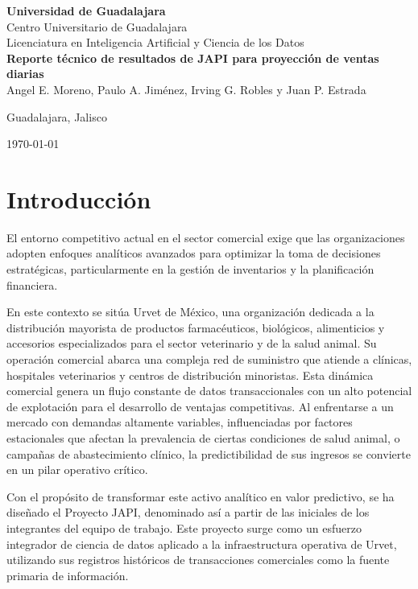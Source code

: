 \documentclass[11pt,a4paper]{report}
\begin{document}
\begin{titlepage}
    \centering
    
    {\textbf{Universidad de Guadalajara}}\\[0.5cm]
    {Centro Universitario de Guadalajara}\\[0.5cm]
    {Licenciatura en Inteligencia Artificial y Ciencia de los Datos}\\[2cm]
    
    {\textbf{Reporte técnico de resultados de JAPI para proyección de ventas diarias}}\\
    {Angel E. Moreno, Paulo A. Jiménez, Irving G. Robles y Juan P. Estrada}
    
    \vfill
    
    {Guadalajara, Jalisco \par}
    \monthyeardate\today
    
\end{titlepage}

\tableofcontents
\newpage

\section{Introducción}
El entorno competitivo actual en el sector comercial exige que las organizaciones adopten enfoques analíticos avanzados
para optimizar la toma de decisiones estratégicas, particularmente en la gestión de inventarios y la planificación financiera.

En este contexto se sitúa Urvet de México, una organización dedicada a la distribución mayorista de productos farmacéuticos,
biológicos, alimenticios y accesorios especializados para el sector veterinario y de la salud animal.
Su operación comercial abarca una compleja red de suministro que atiende a clínicas, hospitales veterinarios y centros de distribución minoristas.
Esta dinámica comercial genera un flujo constante de datos transaccionales con un alto potencial de explotación para el desarrollo de ventajas competitivas.
Al enfrentarse a un mercado con demandas altamente variables, influenciadas por factores estacionales que afectan
la prevalencia de ciertas condiciones de salud animal, o campañas de abastecimiento clínico, la predictibilidad de sus ingresos se convierte en un pilar operativo crítico.

Con el propósito de transformar este activo analítico en valor predictivo, se ha diseñado el Proyecto JAPI, denominado así a partir de las iniciales
de los integrantes del equipo de trabajo. Este proyecto surge como un esfuerzo integrador de ciencia de datos aplicado a la infraestructura operativa de Urvet,
utilizando sus registros históricos de transacciones comerciales como la fuente primaria de información.
\end{document}
